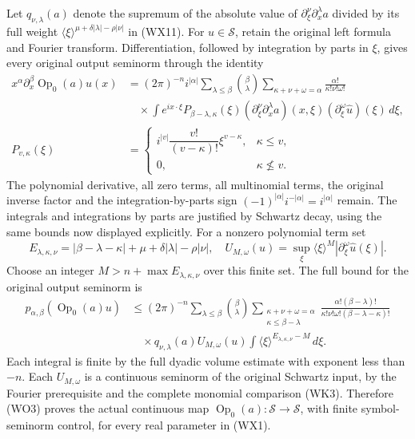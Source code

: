 \documentclass[
  11pt,
]{article}
\begin{document}
Let \(q_{\nu,\lambda}(a)\) denote the supremum of the absolute value of
\(\partial_\xi^\nu\partial_x^\lambda a\) divided by its full weight
\(\langle\xi\rangle^{\mu+\delta|\lambda|-\rho|\nu|}\) in (WX11). For
\(u\in\mathcal S\), retain the original left formula and Fourier
transform. Differentiation, followed by integration by parts in \(\xi\),
gives every original output seminorm through the identity \[
 \begin{aligned}
 x^\alpha\partial_x^\beta\operatorname{Op}_0(a)u(x)
 &=(2\pi)^{-n}i^{|\alpha|}
   \sum_{\lambda\leq\beta}\binom\beta\lambda
   \sum_{\kappa+\nu+\omega=\alpha}
         \frac{\alpha!}{\kappa!\nu!\omega!}\\
 &\quad\times\int e^{ix\cdot\xi}
       P_{\beta-\lambda,\kappa}(\xi)
       (\partial_\xi^\nu\partial_x^\lambda a)(x,\xi)
       (\partial_\xi^\omega\widehat u)(\xi)\,d\xi,\\
 P_{v,\kappa}(\xi)&=
 \begin{cases}
 i^{|v|}\dfrac{v!}{(v-\kappa)!}\xi^{v-\kappa},&\kappa\leq v,\\
 0,&\kappa\not\leq v.
 \end{cases}
 \end{aligned}
 \tag{WO1}
\] The polynomial derivative, all zero terms, all multinomial terms, the
original inverse factor and the integration-by-parts sign
\((-1)^{|\alpha|}i^{-|\alpha|}=i^{|\alpha|}\) remain. The integrals and
integrations by parts are justified by Schwartz decay, using the same
bounds now displayed explicitly. For a nonzero polynomial term set \[
 E_{\lambda,\kappa,\nu}=
    |\beta-\lambda-\kappa|+\mu+\delta|\lambda|-\rho|\nu|,
 \quad
 U_{M,\omega}(u)=\sup_\xi\langle\xi\rangle^M
                          |\partial_\xi^\omega\widehat u(\xi)|.
 \tag{WO2}
\] Choose an integer \(M>n+\max E_{\lambda,\kappa,\nu}\) over this
finite set. The full bound for the original output seminorm is \[
 \begin{aligned}
 p_{\alpha,\beta}(\operatorname{Op}_0(a)u)
 &\leq(2\pi)^{-n}
 \sum_{\lambda\leq\beta}\binom\beta\lambda
 \sum_{\substack{\kappa+\nu+\omega=\alpha\\\kappa\leq\beta-\lambda}}
 \frac{\alpha!(\beta-\lambda)!}
      {\kappa!\nu!\omega!(\beta-\lambda-\kappa)!}\\
 &\quad\times q_{\nu,\lambda}(a)U_{M,\omega}(u)
             \int\langle\xi\rangle^{E_{\lambda,\kappa,\nu}-M}\,d\xi.
 \end{aligned}
 \tag{WO3}
\] Each integral is finite by the full dyadic volume estimate with
exponent less than \(-n\). Each \(U_{M,\omega}\) is a continuous
seminorm of the original Schwartz input, by the Fourier prerequisite and
the complete monomial comparison (WK3). Therefore (WO3) proves the
actual continuous map
\(\operatorname{Op}_0(a):\mathcal S\to\mathcal S\), with finite
symbol-seminorm control, for every real parameter in (WX1).
\end{document}
